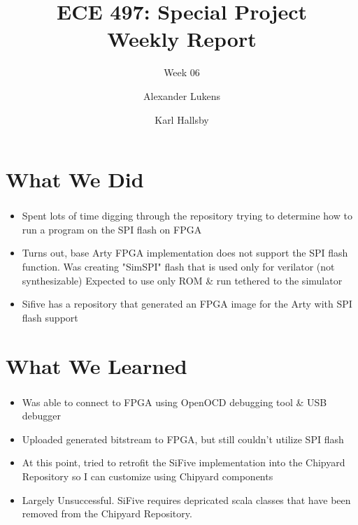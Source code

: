 \documentclass{../weeklyslides}
\title[Weekly Report]{ECE 497: Special Project \\ Weekly Report}
\subtitle{Week 06}
\author{Alexander Lukens \and Karl Hallsby}
\institute{Illinois Institute of Technology}
\date{\DTMdisplaydate{2021}{3}{3}{-1}}
\begin{document}
\nocite{chipyard}

\begin{frame}
  \titlepage{}
\end{frame}

\section{What We Did}\label{sec:What_We_Did}
\begin{frame}
  \frametitle{}
  \begin{itemize}
  	\item Spent lots of time digging through the repository trying to determine how to run a program on the SPI flash on FPGA
  	\item Turns out, base Arty FPGA implementation does not support the SPI flash function. Was creating "SimSPI" flash that is used only for verilator (not synthesizable) Expected to use only ROM \& run tethered to the simulator
  	\item Sifive has a repository that generated an FPGA image for the Arty with SPI flash support
  \end{itemize}
  
\end{frame}

\section{What We Learned}\label{sec:What_We_Learned}
\begin{frame}
  \frametitle{}
  \begin{itemize}
  	\item Was able to connect to FPGA using OpenOCD debugging tool \& USB debugger
  	\item Uploaded generated bitstream to FPGA, but still couldn't utilize SPI flash
  	\item At this point, tried to retrofit the SiFive implementation into the Chipyard Repository so I can customize using Chipyard components
  	\item Largely Unsuccessful. SiFive requires depricated scala classes that have been removed from the Chipyard Repository.
  \end{itemize}
  
  \end{frame}
\end{document}
